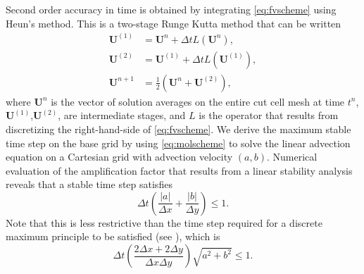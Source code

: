 Second order accuracy in time is obtained by integrating \eqref{eq:fvscheme} using Heun's method.  This is a two-stage Runge Kutta method that can be written
\begin{equation}\label{eq:molscheme}
\begin{aligned}
	\mathbf{U}^{(1)} &= \mathbf{U}^{n} + \Delta t L(\mathbf{U}^n), \\
	\mathbf{U}^{(2)} &= \mathbf{U}^{(1)} + \Delta t L(\mathbf{U}^{(1)}), \\
	\mathbf{U}^{n+1} &= \frac{1}{2}( \mathbf{U}^{n} + \mathbf{U}^{(2)} ) ,	
\end{aligned}
\end{equation}
where $\mathbf{U}^{n}$ is the vector of solution averages on the entire cut cell mesh at time $t^n$,
$\mathbf{U}^{(1)}$,$\mathbf{U}^{(2)}$, are intermediate stages, and $L$ is the operator that results
from discretizing the right-hand-side of \eqref{eq:fvscheme}.
We derive the maximum stable time step on the base grid by using \eqref{eq:molscheme} to solve the linear advection equation on a Cartesian grid with advection velocity $(a,b)$.
Numerical evaluation of the amplification factor that results from a linear stability analysis reveals that a stable time step satisfies
\begin{equation}\label{eq:vn1}
\Delta t   \left( \frac{|a|}{\Delta x} + \frac{|b|}{\Delta y} \right)\leq 1.
\end{equation}
Note that this is less restrictive than the time step required for a discrete maximum principle to be 
satisfied (see \cite{giuliani2018analysis}), which is 
\begin{equation}
\Delta t  \left( \frac{2\Delta x + 2 \Delta y}{\Delta x \Delta y} \right) \sqrt{a^2 + b^2}\leq 1 .
\end{equation}

